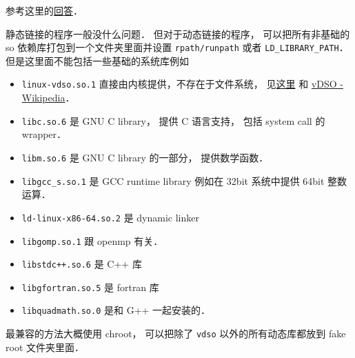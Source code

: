 
\begin{issues}
\issueDraft
\end{issues}


参考这里的\href{https://stackoverflow.com/questions/20183883/determining-binary-compatibility-under-linux}{回答}．

静态链接的程序一般没什么问题． 但对于动态链接的程序， 可以把所有非基础的 so 依赖库打包到一个文件夹里面并设置 \verb|rpath/runpath| 或者 \verb|LD_LIBRARY_PATH|． 但是这里面不能包括一些基础的系统库例如
\begin{itemize}
\item \verb`linux-vdso.so.1` 直接由内核提供，不存在于文件系统， 见\href{https://unix.stackexchange.com/questions/476971/ldd-shows-no-location-after-arrow-library-does-not-exist-on-system}{这里} 和 \href{https://en.wikipedia.org/wiki/VDSO}{vDSO - Wikipedia}．
\item \verb`libc.so.6` 是 GNU C library， 提供 C 语言支持， 包括 system call 的 wrapper．
\item \verb`libm.so.6` 是 GNU C library 的一部分， 提供数学函数．
\item \verb`libgcc_s.so.1` 是 GCC runtime library 例如在 32bit 系统中提供 64bit 整数运算．
\item \verb`ld-linux-x86-64.so.2` 是 dynamic linker
\item \verb`libgomp.so.1` 跟 openmp 有关．
\item \verb`libstdc++.so.6` 是 C++ 库
\item \verb`libgfortran.so.5` 是 fortran 库
\item \verb`libquadmath.so.0` 是和 G++ 一起安装的．
\end{itemize}

最兼容的方法大概使用 chroot， 可以把除了 \verb|vdso| 以外的所有动态库都放到 fake root 文件夹里面．
